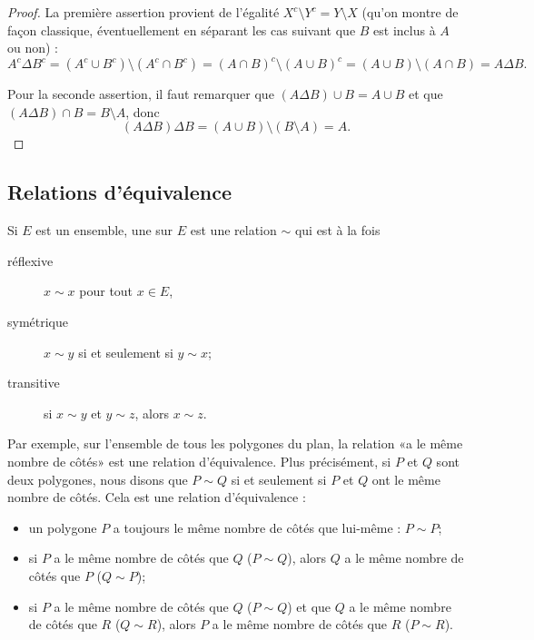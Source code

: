 \begin{proof}
    La première assertion provient de l'égalité \( X^c\setminus Y^c=Y\setminus X\) (qu'on montre de façon classique, éventuellement en séparant les cas suivant que \( B\) est inclus à \( A\) ou non) :
    \begin{equation}
        A^c\Delta B^c=(A^c\cup B^c)\setminus(A^c\cap B^c)=(A\cap B)^c\setminus(A\cup B)^c=(A\cup B)\setminus (A\cap B)=A\Delta B.
    \end{equation}

    Pour la seconde assertion, il faut remarquer que \( (A\Delta B)\cup B=A\cup B\) et que \( (A\Delta B)\cap B=B\setminus A\), donc
    \begin{equation}
        (A\Delta B)\Delta B=(A\cup B)\setminus (B\setminus A)=A.
    \end{equation}
\end{proof}

\subsection{Relations d'équivalence}
\label{appEquivalence}

\begin{definition}  \label{DefHoJzMp}
Si $E$ est un ensemble, une  sur $E$ est une relation $\sim$ qui est à la fois
\begin{description}
	\item[réflexive] $x\sim x$ pour tout $x\in E$,
	\item[symétrique] $x\sim y$ si et seulement si $y\sim x$;
	\item[transitive] si $x\sim y$ et $y\sim z$, alors $x\sim z$.
\end{description}
\end{definition}

Par exemple, sur l'ensemble de tous les polygones du plan, la relation «a le même nombre de côtés» est une relation d'équivalence. Plus précisément, si $P$ et $Q$ sont deux polygones, nous disons que $P\sim Q$ si et seulement si $P$ et $Q$ ont le même nombre de côtés. Cela est une relation d'équivalence :
\begin{itemize}
	\item 
		un polygone $P$ a toujours le même nombre de côtés que lui-même : $P\sim P$;
	\item
		si $P$ a le même nombre de côtés que $Q$ ($P\sim Q$), alors $Q$ a le même nombre de côtés que $P$ ($Q\sim P$);
	\item
		si $P$ a le même nombre de côtés que $Q$ ($P\sim Q$) et que $Q$ a le même nombre de côtés que $R$ ($Q\sim R$), alors $P$ a le même nombre de côtés que $R$ ($P\sim R$).
\end{itemize}

